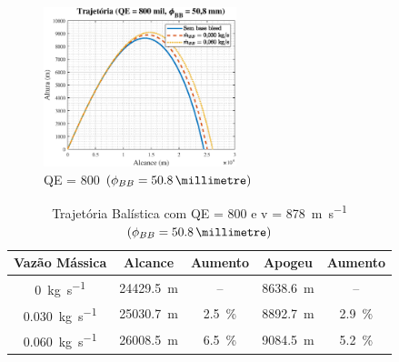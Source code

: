 \begin{figure}[!ht]
	\centering
    \includegraphics[width=0.5\textwidth]{foto4-qe800mil-2pol.eps}
    \caption[QE = \qty{800}{\milliradian} \(\left(\phi_{BB} = \qty{50,8}{\millimetre}\right)\)]{QE = \qty{800}{\milliradian} \(\left(\phi_{BB} = \qty{50,8}{\millimetre}\right)\)}
    \label{fig:trajetoria-2pol-800mil}
\end{figure}

\begin{table}[ht]
\centering
\caption[Trajetória Balística com QE = \qty{800}{\milliradian} e v = \qty{878}{\metre\per\second} \(\left(\phi_{BB} = \qty{50,8}{\millimetre}\right)\)]{Trajetória Balística com QE = \qty{800}{\milliradian} e v = \qty[per-mode = symbol]{878}{\metre\per\second} \(\left(\phi_{BB} = \qty{50,8}{\millimetre}\right)\)}
\vspace{0.5cm}
\begin{tabular}{c|c|c|c|c}
Vazão Mássica & Alcance & Aumento & Apogeu & Aumento \\
\hline
\qty{0}{\kilogram\per\second} & \qty{24429,5}{\metre} & -- & \qty{8638,6}{\metre} & -- \\ 
\qty{0,030}{\kilogram\per\second} & \qty{25030,7}{\metre} & \qty{2,5}{\percent} & \qty{8892,7}{\metre} & \qty{2,9}{\percent} \\
\qty{0,060}{\kilogram\per\second} & \qty{26008,5}{\metre} & \qty{6,5}{\percent} & \qty{9084,5}{\metre} & \qty{5,2}{\percent}
\end{tabular}
\label{tab:tabela-800mil-bb-2pol}
\end{table}